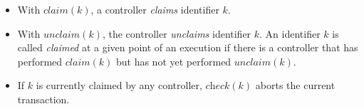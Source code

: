 \documentclass[conference]{sigcomm-alternate}
\newcommand{\Nat}{\mathbb{N}}
\newcommand{\claimcheck}{check\xspace}
\newcommand{\compare}{compare\xspace}
\newcommand{\petr}[1]{\textit{\textcolor{blue}{[petr]: #1}}} %
\begin{document}
\begin{itemize}
\item With $\textit{claim}(k)$,
a controller %
\emph{claims}  identifier $k$.

\item With $\textit{unclaim}(k)$, %
the controller %
  \emph{unclaims} identifier $k$.
An identifier $k$ is called \emph{claimed} at a given point of an
execution if there is a controller that has performed $\textit{claim}(k)$
but has not yet performed  $\textit{unclaim}(k)$.   

\item If $k$ is currently claimed by any controller,
$\textit{\claimcheck}(k)$ %
aborts the current transaction.

\end{itemize}

\end{document}
